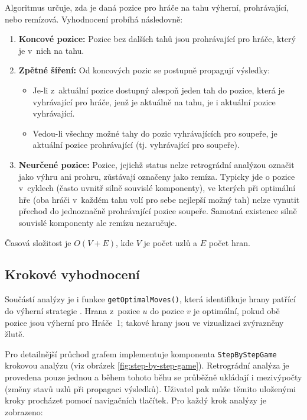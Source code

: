 Algoritmus určuje, zda je daná pozice pro hráče na tahu výherní, prohrávající, nebo remízová. Vyhodnocení probíhá následovně:

\begin{enumerate}
    \item \textbf{Koncové pozice:} Pozice bez dalších tahů jsou prohrávající pro hráče, který je v~nich na tahu.
    
    \item \textbf{Zpětné šíření:} Od koncových pozic se postupně propagují výsledky:
    \begin{itemize}
        \item Je-li z~aktuální pozice dostupný alespoň jeden tah do pozice, která je vyhrávající pro hráče, jenž je aktuálně na tahu, je i aktuální pozice vyhrávající.
        \item Vedou-li všechny možné tahy do pozic vyhrávajících pro soupeře, je aktuální pozice prohrávající (tj. vyhrávající pro soupeře).
    \end{itemize}
    
    \item \textbf{Neurčené pozice:} Pozice, jejichž status nelze retrográdní analýzou označit jako výhru ani prohru, zůstávají označeny jako remíza. Typicky jde o pozice v~cyklech (často uvnitř silně souvislé komponenty), ve kterých při optimální hře (oba hráči v~každém tahu volí pro sebe nejlepší možný tah) nelze vynutit přechod do jednoznačně prohrávající pozice soupeře. Samotná existence silně souvislé komponenty ale remízu nezaručuje.
\end{enumerate}

Časová složitost je \( O(V + E) \), kde \( V \) je počet uzlů a \( E \) počet hran.

\subsection{Krokové vyhodnocení}
\label{sec:GamesStepByStepImpl}
\label{sec:GamesOptimalMovesImpl}

Součástí analýzy je i funkce \texttt{getOptimalMoves()}, která identifikuje hrany patřící do výherní strategie \cite{sawa}. Hrana z~pozice \( u \) do pozice \( v \) je optimální, pokud obě pozice jsou výherní pro Hráče~1; takové hrany jsou ve vizualizaci zvýrazněny žlutě.

Pro detailnější průchod grafem implementuje komponenta \texttt{StepByStepGame} krokovou analýzu (viz obrázek \ref{fig:step-by-step-game}). Retrográdní analýza je provedena pouze jednou a během tohoto běhu se průběžně ukládají i mezivýpočty (změny stavů uzlů při propagaci výsledků). Uživatel pak může těmito uloženými kroky procházet pomocí navigačních tlačítek. Pro každý krok analýzy je zobrazeno:

